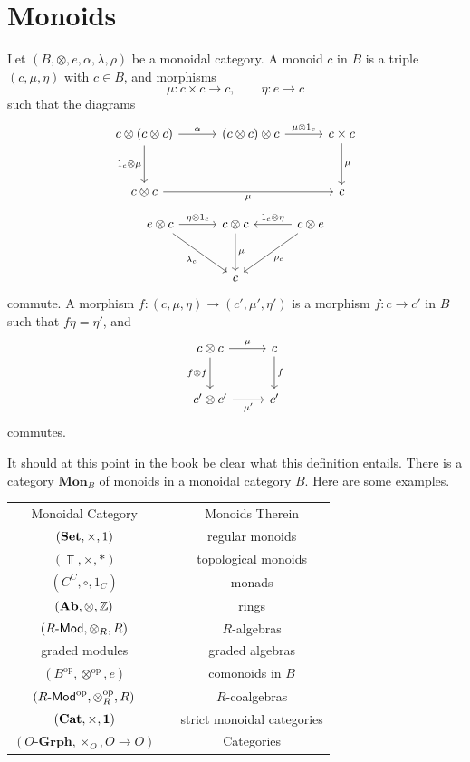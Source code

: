\section{Monoids}

\begin{definition}[Monoid]\label{dfn:7.3}
	Let $(B,\otimes ,e,\alpha,\lambda,\rho)$ be a monoidal category. A monoid $c$ in $B$ is a triple $(c,\mu,\eta)$ with $c\in B$, and morphisms
	\[
		\mu : c\times c\to c,\qquad \eta : e \to c
	\]
	such that the diagrams
	\[\begin{tikzcd}[row sep = 3em, column sep = 3em]
	c\otimes (c\otimes c)\ar[" \alpha ", r] \ar[" 1_c\otimes \mu "', d]  & (c\otimes c)\otimes c \ar[" \mu \otimes 1_c ", r]  & c\times c \ar[" \mu ", d]  \\
	c\otimes c \ar[" \mu "', rr]  &  & c
	\end{tikzcd}\]
	\[\begin{tikzcd}[row sep = 3em, column sep = 3em]
	e\otimes c \ar[" \eta \otimes 1_c ", r] \ar[" \lambda_c "', dr]  &c\otimes c \ar[" \mu ", d]  & c\otimes e \ar[" 1_c \otimes \eta "', l] \ar[" \rho_c ", dl]  \\
	 & c & 
	\end{tikzcd}\]
	commute. A morphism $f : (c,\mu,\eta) \to (c',\mu',\eta')$ is a morphism $f : c \to c'$ in $B$ such that $f\eta = \eta'$, and
	\[\begin{tikzcd}[row sep = 2.5em, column sep = 2.5em]
	c\otimes c \ar[" \mu ", r] \ar[" f\otimes f "', d]  & c \ar[" f ", d]  \\
	c' \otimes c' \ar[" \mu' "', r]  & c'
	\end{tikzcd}\]
	commutes.
\end{definition}


It should at this point in the book be clear what this definition entails. There is a category $\mathbf{Mon} _B$ of monoids in a monoidal category $B$. Here are some examples.

\begin{center}
\begin{tabular}{ccc}
	Monoidal Category & & Monoids Therein\\
	$(\mathbf{Set} ,\times ,1)$&&regular monoids\\
	$(\Top ,\times ,*)$&&topological monoids\\
	$(C^C,\circ ,1_C)$&&monads\\
	$(\mathbf{Ab},\otimes ,\mathbb{Z} )$&&rings\\
	$(R\text{-}\mathsf{Mod} ,\otimes _R,R)$&&$R$-algebras\\
	graded modules&&graded algebras\\
	$(B^{\mathrm{op} } ,\otimes ^{\mathrm{op} } , e)$&&comonoids in $B$\\
	$(R\text{-}\mathsf{Mod} ^{\mathrm{op} } ,\otimes_R^{\mathrm{op} } ,R)$&&$R$-coalgebras\\
	$(\mathbf{Cat} ,\times ,\mathbf{1} )$&&strict monoidal categories\\
	$(O\text{-} \mathbf{Grph} ,\times _O,O\to O)$&&Categories
\end{tabular}
\end{center}

